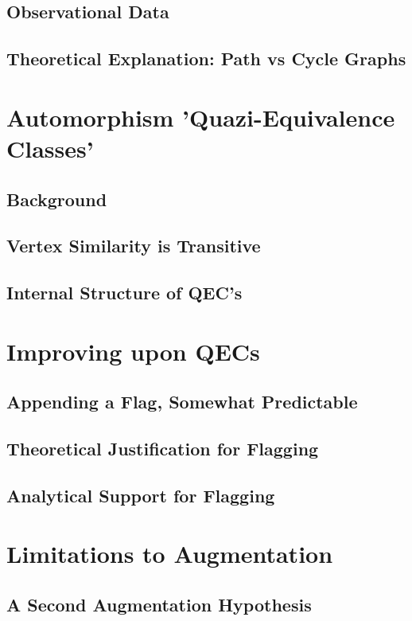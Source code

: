 \documentclass[11pt,a4paper]{report}
\begin{document}
\subsection{Observational Data}
\subsection{Theoretical Explanation: Path vs Cycle Graphs}

\section{Automorphism 'Quazi-Equivalence Classes'}
\subsection{Background}
\subsection{Vertex Similarity is Transitive}
\subsection{Internal Structure of QEC's}

\section{Improving upon QECs}
\subsection{Appending a Flag, Somewhat Predictable}
\subsection{Theoretical Justification for Flagging}
\subsection{Analytical Support for Flagging}

\section{Limitations to Augmentation}
\subsection{A Second Augmentation Hypothesis}
\end{document}
